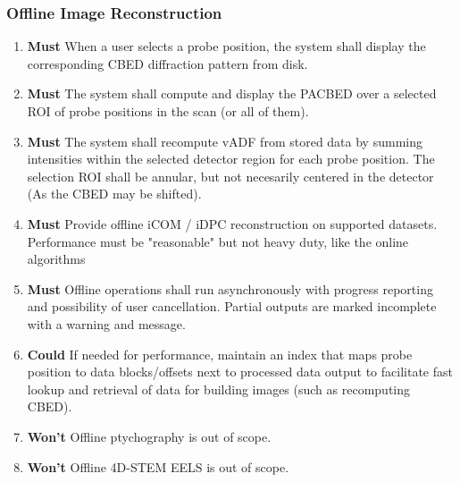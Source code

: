 \documentclass[10pt]{article}
\newcommand{\PriorityTag}[2]{%
    \colorbox{#2!25}{\footnotesize\textsf{\textbf{#1}}}\hspace{0.6em}}
\newcommand{\must}{\leavevmode\PriorityTag{Must}{green}}
\newcommand{\could}{\leavevmode\PriorityTag{Could}{cyan}}
\newcommand{\wont}{\leavevmode\PriorityTag{Won't}{red}}
\newcounter{reqgrp}[section] %
\newcounter{reqno}
\newcommand{\reqprefix}{GEN}
\newenvironment{requirements}[1]{%
    \renewcommand{\reqprefix}{#1}%
    \refstepcounter{reqgrp}%
    \setcounter{reqno}{0}%
    \begin{enumerate}[leftmargin=*]
    }{\end{enumerate}}
\begin{document}
    \subsubsection{Offline Image Reconstruction}
    \begin{requirements}{OFR}

        \item \must {}
        {When a user selects a probe position, the system shall display the corresponding CBED diffraction pattern from disk.}

        \item \must {}
        {The system shall compute and display the PACBED over a selected ROI of probe positions in the scan (or all of them).}

        \item \must {}
        {The system shall recompute vADF from stored data by summing intensities within the selected detector region for each probe position. The selection ROI shall be annular,  but not necesarily centered in the detector (As the CBED may be shifted).}

        \item \must {}
        {Provide offline iCOM / iDPC reconstruction on supported datasets. Performance must be "reasonable" but not heavy duty, like the online algorithms}

        \item \must {}
        {Offline operations shall run asynchronously with progress reporting and possibility of user cancellation. Partial outputs are marked incomplete with a warning and message.}

        \item \could {}
        {If needed for performance, maintain an index that maps probe position to data blocks/offsets next to processed data output to facilitate fast lookup and retrieval of data for building images (such as recomputing CBED).}

        \item \wont {}
        {Offline ptychography is out of scope.}

        \item \wont {}
        {Offline 4D-STEM EELS is out of scope.}

    \end{requirements}
\end{document}
